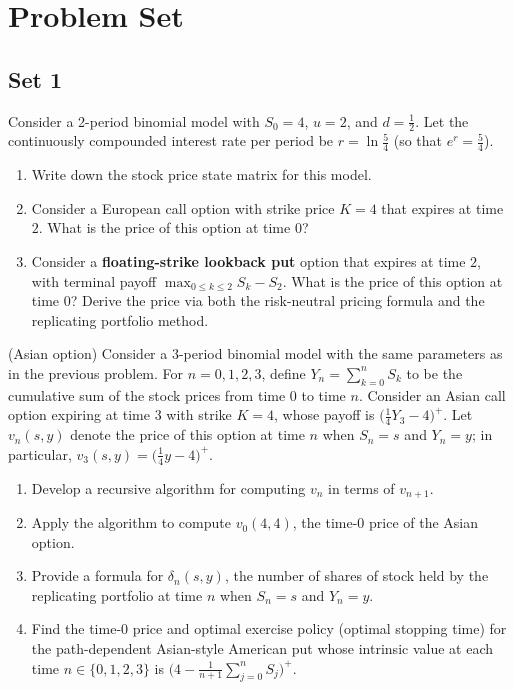\chapter{Problem Set}\label{ch:problem-set}
\section{Set 1}
\begin{problem}
    Consider a 2-period binomial model with $S_0 = 4$, $u = 2$, and $d = \frac{1}{2}$. Let the continuously compounded interest rate per period be $r = \ln\frac{5}{4}$ (so that $e^r = \frac{5}{4}$).
    \begin{enumerate}
        \item Write down the stock price state matrix for this model.
        \item Consider a European call option with strike price $K = 4$ that expires at time $2$. What is the price of this option at time $0$?
        \item Consider a \textbf{floating-strike lookback put} option that expires at time $2$, with terminal payoff $\max_{0 \leq k \leq 2} S_k - S_2$. What is the price of this option at time $0$? Derive the price via both the risk-neutral pricing formula and the replicating portfolio method.
    \end{enumerate}
\end{problem}

\begin{problem}
    (Asian option) Consider a 3-period binomial model with the same parameters as in the previous problem. For $n = 0, 1, 2, 3$, define $Y_n = \sum_{k=0}^n S_k$ to be the cumulative sum of the stock prices from time $0$ to time $n$. Consider an Asian call option expiring at time $3$ with strike $K = 4$, whose payoff is $\bigl(\frac{1}{4} Y_3 - 4\bigr)^{+}$. Let $v_n(s, y)$ denote the price of this option at time $n$ when $S_n = s$ and $Y_n = y$; in particular, $v_3(s, y) = \bigl(\frac{1}{4} y - 4\bigr)^{+}$.
    \begin{enumerate}
        \item Develop a recursive algorithm for computing $v_n$ in terms of $v_{n+1}$.
        \item Apply the algorithm to compute $v_0(4, 4)$, the time-$0$ price of the Asian option.
        \item Provide a formula for $\delta_n(s, y)$, the number of shares of stock held by the replicating portfolio at time $n$ when $S_n = s$ and $Y_n = y$.
        \item Find the time-$0$ price and optimal exercise policy (optimal stopping time) for the path-dependent Asian-style American put whose intrinsic value at each time $n \in \{0, 1, 2, 3\}$ is $\bigl(4 - \frac{1}{n+1} \sum_{j=0}^n S_j\bigr)^{+}$.
    \end{enumerate}
\end{problem}


